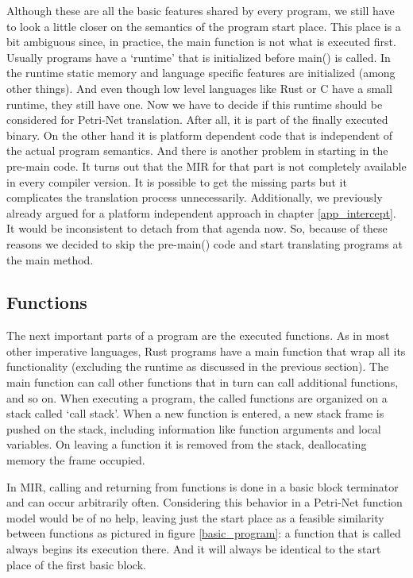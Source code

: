 Although these are all the basic features shared by every program, we still have to look a little closer on the semantics of the program start place.
This place is a bit ambiguous since, in practice, the main function is not what is executed first.
Usually programs have a `runtime' that is initialized before main() is called.
In the runtime  static memory and language specific features are initialized (among other things).
And even though low level languages like Rust or C have a small runtime, they still have one.
Now we have to decide if this runtime should be considered for Petri-Net translation.
After all, it is part of the finally executed binary.
On the other hand it is platform dependent code that is independent of the actual program semantics.
And there is another problem in starting in the pre-main code.
It turns out that the MIR for that part is not completely available in every compiler version.
It is possible to get the missing parts but it complicates the translation process unnecessarily.
Additionally, we previously already argued for a platform independent approach in chapter \ref{app_intercept}.
It would be inconsistent to detach from that agenda now.
So, because of these reasons we decided to skip the pre-main() code and start translating programs at the main method.

\subsection{Functions}
The next important parts of a program are the executed functions.
As in most other imperative languages, Rust programs have a main function that wrap all its functionality (excluding the runtime as discussed in the previous section).
The main function can call other functions that in turn can call additional functions, and so on.
When executing a program, the called functions are organized on a stack called `call stack'.
When a new function is entered, a new stack frame is pushed on the stack, including information like function arguments and local variables.
On leaving a function it is removed from the stack, deallocating memory the frame occupied.

In MIR, calling and returning from functions is done in a basic block terminator and can occur arbitrarily often.
Considering this behavior in a Petri-Net function model would be of no help, leaving just the start place as a feasible similarity between functions as pictured in figure \ref{basic_program}:
a function that is called always begins its execution there.
And it will always be identical to the start place of the first basic block.

